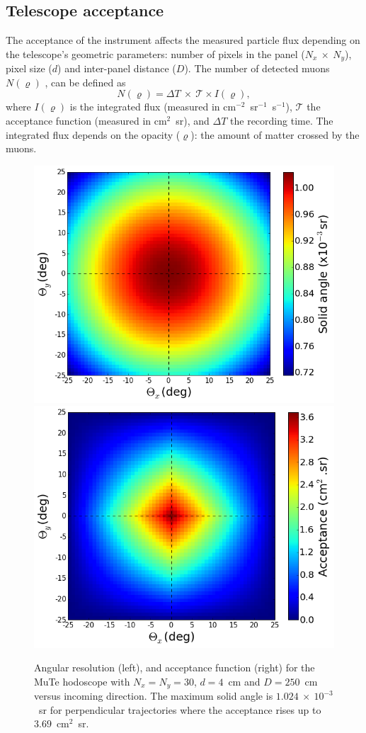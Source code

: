 \documentclass[letterpaper,11pt]{article}
\begin{document}
\subsection{Telescope acceptance}
The acceptance of the instrument affects the measured particle flux depending on the telescope's geometric parameters: number of pixels in the panel ($N_x~\times~N_y$), pixel size ($d$) and inter-panel distance ($D$). The number of detected muons $N(\varrho)$ \cite{LesparreEtal2010}, can be defined as
\begin{equation}
N(\varrho)=\Delta T~\times~\mathcal{T}\times I(\varrho), \label{Nmuons}
\end{equation}
where $I(\varrho)$ is the integrated flux (measured in cm$^{-2}$~sr$^{-1}$~s$^{-1}$), $\mathcal{T}$ the acceptance function (measured in cm$^{2}$~sr), and $\Delta T$ the recording time. The integrated flux depends on the opacity ($\varrho$): the amount of matter crossed by the muons.

\begin{figure}[htb]
\centering
\includegraphics[width=0.48\columnwidth]{Figures/Solid_angle.png}
\includegraphics[width=0.48\columnwidth]{Figures/Aceptancia.png}
\caption{Angular resolution (left), and acceptance function (right) for the MuTe hodoscope with $N_x=N_y=30$, $d=4$~cm and $D=250$~cm versus incoming direction. The maximum solid angle is $1.024~\times~10^{-3}$~sr for perpendicular trajectories where the acceptance rises up to $3.69$~cm$^{2}$~sr.}
\label{fig:acceptance}
\end{figure}
\end{document}
